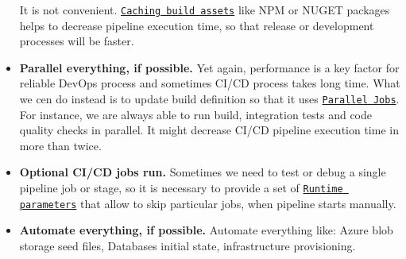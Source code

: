 \begin{itemize}
    It is not convenient.
    \href{https://learn.microsoft.com/en-us/azure/devops/pipelines/release/caching?view=azure-devops}
    {\texttt{Caching build assets}}
    like NPM or NUGET packages helps to decrease pipeline execution time, so that release or development
    processes will be faster.
    \item \textbf{Parallel everything, if possible.} Yet again, performance is a key factor for reliable DevOps process
    and sometimes CI/CD process takes long time.
    What we cen do instead is to update build definition so that it uses
    \href{https://learn.microsoft.com/en-us/azure/devops/pipelines/licensing/concurrent-jobs?view=azure-devops&tabs=ms-hosted}
    {\texttt{Parallel Jobs}}.
    For instance, we are always able to run build, integration tests and code quality checks in parallel.
    It might decrease CI/CD pipeline execution time in more than twice.
    \item \textbf{Optional CI/CD jobs run.} Sometimes we need to test or debug a single pipeline job or stage, so it is
    necessary to provide a set of
    \href{https://learn.microsoft.com/en-us/azure/devops/pipelines/process/runtime-parameters?view=azure-devops&tabs=script}
    {\texttt{Runtime parameters}}
    that allow to skip particular jobs, when pipeline starts manually.
    \item \textbf{Automate everything, if possible.}
    Automate everything like: Azure blob storage seed files, Databases initial state, infrastructure provisioning.
\end{itemize}